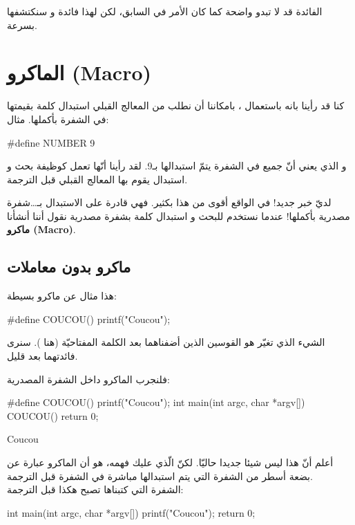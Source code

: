 الفائدة قد لا تبدو واضحة كما كان الأمر في السابق، لكن لهذا فائدة و سنكتشفها بسرعة.

\section{الماكرو (\textenglish{Macro})}

كنا قد رأينا بانه باستعمال ،
بامكاننا أن نطلب من المعالج القبلي استبدال كلمة بقيمتها في الشفرة بأكملها. مثال:

\begin{Csource}
#define NUMBER 9
\end{Csource}

و الذي يعني أنّ جميع
في الشفرة يتمّ استبدالها بـ9. لقد رأينا أنّها تعمل كوظيفة بحث و استبدال يقوم بها المعالج القبلي قبل الترجمة.

لديّ خبر جديد! في الواقع
أقوى من هذا بكثير. فهي قادرة على الاستبدال بـ\dots شفرة مصدرية بأكملها! عندما نستخدم
للبحث و استبدال كلمة بشفرة مصدرية نقول أننا أنشأنا
\textbf{ماكرو
(\textenglish{Macro})}.

\subsection{ماكرو بدون معاملات}

هذا مثال عن ماكرو بسيطة:

\begin{Csource}
#define COUCOU() printf("Coucou");
\end{Csource}

الشيء الذي تغيّر هو القوسين الذين أضفناهما بعد الكلمة المفتاحيّة (هنا
).
سنرى فائدتهما بعد قليل.

فلنجرب الماكرو داخل الشفرة المصدرية:

\begin{Csource}
#define COUCOU() printf("Coucou");
int main(int argc, char *argv[])
{
  COUCOU()
  return 0;
}
\end{Csource}

\begin{Console}
Coucou
\end{Console}

أعلم أنّ هذا ليس شيئا جديدا حاليّا. لكنّ الّذي عليك فهمه، هو أن الماكرو عبارة عن بضعة أسطر من الشفرة التي يتم استبدالها مباشرة في الشفرة قبل الترجمة.\\
الشفرة التي كتبناها تصبح هكذا قبل الترجمة:

\begin{Csource}
int main(int argc, char *argv[])
{
	printf("Coucou");
	return 0;
}
\end{Csource}

